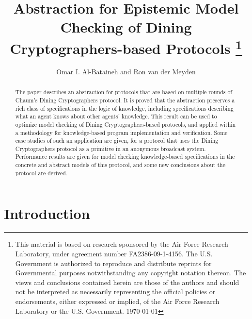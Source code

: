 \documentclass[]{llncs}
\begin{document}
\title{Abstraction for Epistemic Model Checking of Dining Cryptographers-based 
Protocols
\thanks{ This material is based on research sponsored by the Air Force Research Laboratory, under agreement number FA2386-09-1-4156. The U.S. Government is authorized to reproduce and distribute reprints for Governmental purposes notwithstanding any copyright notation thereon. The views and conclusions contained herein are those of the authors and should not be interpreted as necessarily representing the official policies or endorsements, either expressed or implied, of the Air Force Research Laboratory or the U.S. Government.
\today}}

\author{Omar I. Al-Bataineh and Ron van der Meyden}
\maketitle

\begin{abstract}
The paper describes an abstraction for protocols that are based on multiple rounds of 
Chaum's Dining Cryptographers protocol. It is proved that the abstraction preserves a rich class of 
specifications in the logic of knowledge, including specifications 
describing what an agent knows about other agents' knowledge. 
This result can be used to optimize model checking of 
Dining Cryptographers-based protocols, and applied within a methodology 
for knowledge-based program implementation and verification. 
Some case studies of such an application are given,  
for a protocol that uses the Dining Cryptographers protocol 
as a primitive in an anonymous broadcast system. 
Performance results are given for model checking 
knowledge-based specifications in the concrete and abstract models of this protocol, and some
new conclusions about the protocol are derived. 
\end{abstract}

\section{Introduction}
\end{document}
